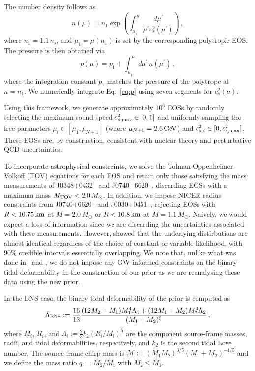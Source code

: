 \documentclass[twocolumn,linenumbers]{aastex631}
\begin{document}
The number density follows as 
%
\begin{equation} \label{eq:n}
 n(\mu) = n_1 \exp \left({\int_{\mu_1}^\mu \frac{d\mu^\prime}{\mu^\prime
     c_s^2(\mu^\prime)}}\right)\,,
\end{equation} 
%
where $n_1 = 1.1\,n_s$, and $\mu_1 = \mu(n_1)$ is set by the
corresponding polytropic EOS. The pressure is then obtained via
%
\begin{equation} \label{eq:p}
 p(\mu) = p_1 + \int_{\mu_1}^\mu d\mu^\prime \, n(\mu^\prime)\,,
\end{equation}
%
where the integration constant $p_1$ matches the pressure of the
polytrope at $n = n_1$. We numerically integrate Eq.~\eqref{eq:p} using
seven segments for $c_s^2(\mu)$.

Using this framework, we generate approximately $10^6$ EOSs by randomly
selecting the maximum sound speed $c_{s,{\rm max}}^2 \in [0,1]$ and
uniformly sampling the free parameters $\mu_i \in [\mu_1, \mu_{N+1}]$
(where $\mu_{N+1} = 2.6\,\rm GeV$) and $c_{s,i}^2 \in [0, c_{s,{\rm
      max}}^2]$. These EOSs are, by construction, consistent with
nuclear theory and perturbative QCD uncertainties.

To incorporate astrophysical constraints, we solve the
Tolman-Oppenheimer-Volkoff (TOV) equations for each EOS and retain only
those satisfying the mass measurements of J0348+0432~\citep[][$M =
  2.01\pm 0.04\,M_{\odot}$]{Antoniadis2013} and J0740+6620~\citep[][$M =
  2.08 \pm 0.07\,M_{\odot}$]{Cromartie2019, Fonseca2021}, discarding EOSs
with a maximum mass $M_{\rm TOV} < 2.0\,M_{\odot}$. In addition, we
impose NICER radius constraints from J0740+6620~\citep{Miller2021,
  Riley2021} and J0030+0451~\citep{Riley2019, MCMiller2019b}, rejecting
EOSs with $R < 10.75\,\rm km$ at $M = 2.0\,M_{\odot}$ or $R < 10.8\,\rm
km$ at $M = 1.1\,M_{\odot}$.
Naively, we would expect a loss of information since we are discarding the uncertainties associated with these measurements. 
However, \citet{2023Jiang} showed that the underlying distirbutions are almost identical regardless of the choice of constant or variable likelihood,
with 90\% credible intervals essentially overlapping. 
We note that, unlike what was done
in~\citet{Altiparmak:2022} and \citet{Ecker:2022dlg}, we do not impose any
GW-informed constraints on the binary tidal deformability in the
construction of our prior as we are reanalysing these data using the
new prior.
	
In the BNS case, the binary tidal deformability of the prior is computed
as
%
\begin{equation} 
 \tilde{\Lambda}_{\rm BNS} := \frac{16}{13} \frac{ (12M_2 + M_1) M_1^4
   \Lambda_1 + (12M_1 + M_2) M_2^4 \Lambda_2}{(M_1 + M_2)^5}\,,
\end{equation}
%
where $M_i$, $R_i$, and $\Lambda_i := \frac{2}{3} k_2 \left( R_i/M_i
\right)^5$ are the component source-frame masses, radii, and tidal
deformabilities, respectively, and $k_2$ is the second tidal Love
number. The source-frame chirp mass is $\mathcal{M} := (M_1
M_2)^{3/5} (M_1+M_2)^{-1/5}$ and we define the mass ratio $q := M_2/M_1$
with $M_2\le M_1$.
	
\end{document}
